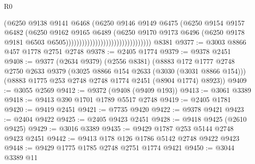 \begin{lexlean}{R0}
\begin{coremodule}
                                                        (@6250
                                                          @9138
                                                          @9141
                                                          @6468
                                                          (@6250
                                                            @9146
                                                            @9149
                                                            @6475
                                                            (@6250
                                                              @9154
                                                              @9157
                                                              @6482
                                                              (@6250
                                                                @9162
                                                                @9165
                                                                @6489
                                                                (@6250
                                                                  @9170
                                                                  @9173
                                                                  @6496
                                                                  (@6250
                                                                    @9178
                                                                    @9181
                                                                    @6503
                                                                    @6505))))))))))))))))))))))))))))))))
    @8381
@9377 := @3003 @8866 @457 @1778 @2751 @2748
@9378 := @2405 @1774
@9379 := @9378 @2451
@9408 := @9377
    (@2634 @9379)
    (@2556 @8381)
    (@8883
      @172
      @1777
      @2748
      @2750
      @2633
      @9379
      (@3025 @8866 @154 @2633 (@3030 (@3031 @8866 @154)))
      (@8883 @1775 @253 @2748 @2748 @1774 @2451 (@8904 @1774) @8923))
@9409 := @3055 @2569
@9412 := @9372 (@9408 (@9409 @193))
@9413 := @3061 @3389
@9418 := @9413 @390 @1701 @1789 @5517 @2748
@9419 := @2405 @1781
@9420 := @9419 @2451
@9421 := @7735 @9420
@9422 := @9378 @9421
@9423 := @2404 @9422
@9425 := @2405 @9423 @2451
@9428 := @9418 @9425 (@2610 @9425)
@9429 := @3016 @3389
@9435 := @9429 @1787 @253 @5144 @2748 @9423 @2451
@9442 := @9413 @178 @126 @1786 @5142 @2748 @9422 @9423
@9448 := @9429 @1775 @1785 @2748 @2751 @1774 @9421
@9450 := @3044 @3389 @11

\end{coremodule}
\end{lexlean}
